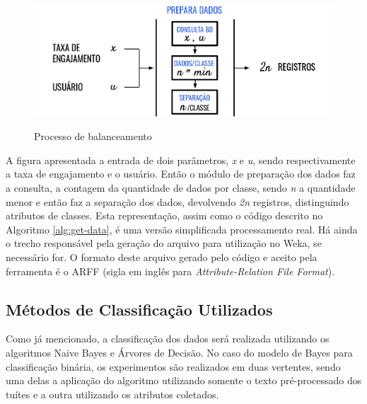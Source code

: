 \documentclass[oneside,openright,12pt]{ufsm_2015} %
\begin{document}
    \begin{figure}[ht]
        \caption{Processo de balanceamento}
        \centering
        \includegraphics[width=.99\textwidth]{figuras/balanceamento.png}
        \vspace{\baselineskip} %
        \label{fig:balanceamento}
    \end{figure}
    
    \par A figura apresentada a entrada de dois parâmetros, \textit{x} e \textit{u}, sendo respectivamente a taxa de engajamento e o usuário. Então o módulo de preparação dos dados faz a consulta, a contagem da quantidade de dados por classe, sendo \textit{n} a quantidade menor e então faz a separação dos dados, devolvendo \textit{2n} registros, distinguindo atributos de classes. Esta representação, assim como o código descrito no Algoritmo \ref{alg:get-data}, é uma versão simplificada processamento real. Há ainda o trecho responsável pela geração do arquivo para utilização no Weka, se necessário for. O formato deste arquivo gerado pelo código e aceito pela ferramenta é o ARFF (sigla em inglês para \textit{Attribute-Relation File Format}).


\subsection{Métodos de Classificação Utilizados}
\label{sec:class-naive-tree}

    \par Como já mencionado, a classificação dos dados será realizada utilizando os algoritmos Naive Bayes e Árvores de Decisão. No caso do modelo de Bayes para classificação binária, os experimentos são realizados em duas vertentes, sendo uma delas a aplicação do algoritmo utilizando somente o texto pré-processado dos tuítes e a outra utilizando os atributos coletados.
    
\end{document}

